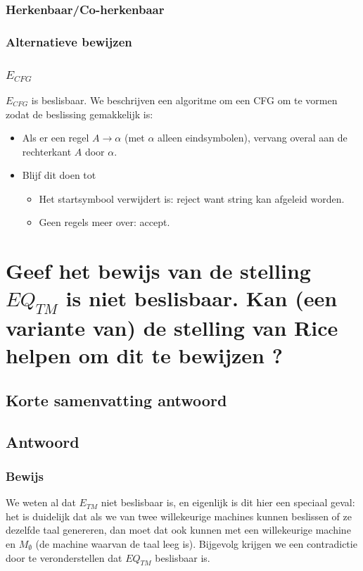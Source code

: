 \documentclass{article}
\begin{document}
        \subsubsection{Herkenbaar/Co-herkenbaar}

        \subsubsection{Alternatieve bewijzen}

        \subsubsection{$E_{CFG}$}
            $E_{CFG}$ is beslisbaar. We beschrijven een algoritme om een CFG om te vormen zodat de beslissing gemakkelijk is:
            \begin{itemize}
                \item Als er een regel $A \rightarrow \alpha$ (met $\alpha$ alleen eindsymbolen), vervang overal aan de rechterkant $A$ door $\alpha$.
                \item Blijf dit doen tot
                \begin{itemize}
                    \item Het startsymbool verwijdert is: reject want string kan afgeleid worden.
                    \item Geen regels meer over: accept.
                \end{itemize}
            \end{itemize}

\newpage
\section{Geef het bewijs van de stelling $EQ_{TM}$ is niet beslisbaar. Kan (een variante van) de stelling van Rice helpen om dit te bewijzen ?}
    \subsection{Korte samenvatting antwoord}

    \subsection{Antwoord}
        \subsubsection{Bewijs}
            We weten al dat $E_{TM}$ niet beslisbaar is, en eigenlijk is dit hier een speciaal geval: het is duidelijk dat als we van twee willekeurige machines kunnen beslissen of ze dezelfde taal genereren, dan moet dat ook kunnen met een willekeurige machine en $M_\emptyset$ (de machine waarvan de taal leeg is). Bijgevolg krijgen we een contradictie door te veronderstellen dat $EQ_{TM}$ beslisbaar is.
\end{document}
